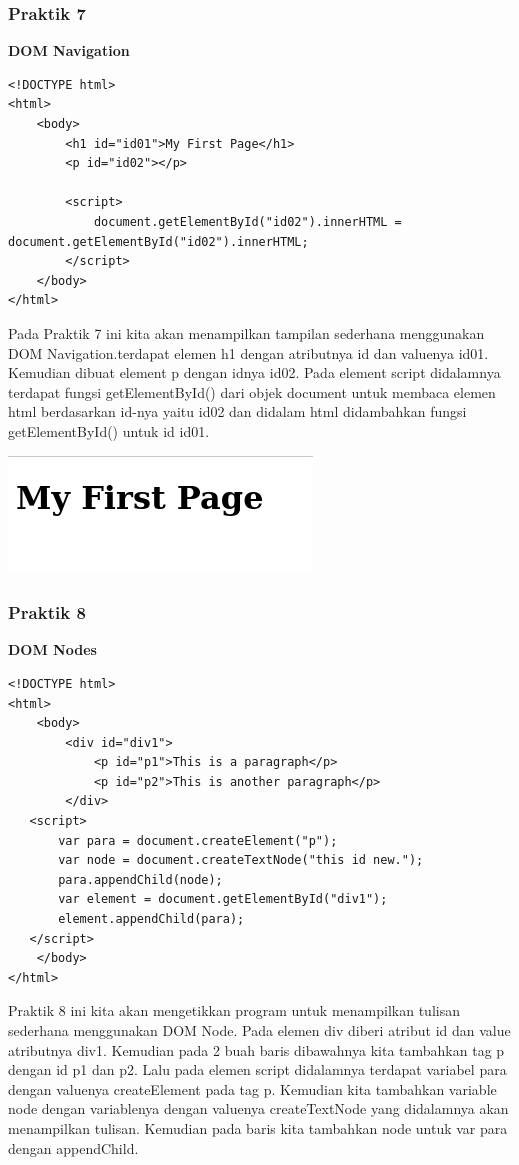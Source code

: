 \documentclass[a4paper,12pt]{article}
\begin{document}
\subsubsection{Praktik 7}
\textbf{DOM Navigation}
\begin{lstlisting}
<!DOCTYPE html>
<html>
    <body>
        <h1 id="id01">My First Page</h1>
        <p id="id02"></p>

        <script>
            document.getElementById("id02").innerHTML = document.getElementById("id02").innerHTML;
        </script>
    </body>
</html>
\end{lstlisting}

Pada Praktik 7 ini kita akan menampilkan tampilan sederhana menggunakan DOM Navigation.\@ terdapat elemen h1 dengan
atributnya id dan valuenya id01. Kemudian dibuat element p dengan idnya id02. Pada element script didalamnya terdapat
fungsi getElementById() dari objek document untuk membaca elemen html berdasarkan id-nya yaitu id02 dan didalam html
didambahkan fungsi getElementById() untuk id id01.

\begin{center}
    \includegraphics[scale=.7]{7.png} 
\end{center}

\subsubsection{Praktik 8}
\textbf{DOM Nodes}
\begin{lstlisting}
<!DOCTYPE html>
<html>
    <body>
        <div id="div1">
            <p id="p1">This is a paragraph</p>
            <p id="p2">This is another paragraph</p>
        </div>
   <script>
       var para = document.createElement("p");
       var node = document.createTextNode("this id new.");
       para.appendChild(node);
       var element = document.getElementById("div1");
       element.appendChild(para);
   </script>
    </body>
</html>
\end{lstlisting}

Praktik 8 ini kita akan mengetikkan program untuk menampilkan tulisan sederhana menggunakan DOM Node. Pada elemen div
diberi atribut id dan value atributnya div1. Kemudian pada 2 buah baris dibawahnya kita tambahkan tag p dengan id p1
dan p2. Lalu pada elemen script didalamnya terdapat variabel para dengan valuenya createElement pada tag p. Kemudian kita
tambahkan variable node dengan variablenya dengan valuenya createTextNode yang didalamnya akan menampilkan tulisan.
Kemudian pada baris kita tambahkan node untuk var para dengan appendChild.
\end{document}
